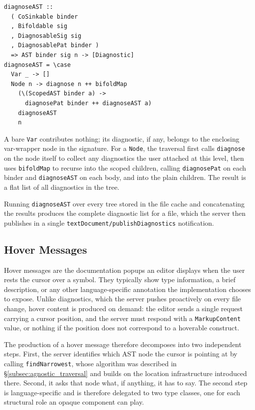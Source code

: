 \begin{verbatim}
diagnoseAST ::
  ( CoSinkable binder
  , Bifoldable sig
  , DiagnosableSig sig
  , DiagnosablePat binder )
  => AST binder sig n -> [Diagnostic]
diagnoseAST = \case
  Var _ -> []
  Node n -> diagnose n ++ bifoldMap
    (\(ScopedAST binder a) ->
      diagnosePat binder ++ diagnoseAST a)
    diagnoseAST
    n
\end{verbatim}

A bare \texttt{Var} contributes nothing; its diagnostic, if any, belongs to the enclosing var-wrapper node in the signature.
For a \texttt{Node}, the traversal first calls \texttt{diagnose} on the node itself to collect any diagnostics the user attached at this level, then uses \texttt{bifoldMap} to recurse into the scoped children, calling \texttt{diagnosePat} on each binder and \texttt{diagnoseAST} on each body, and into the plain children.
The result is a flat list of all diagnostics in the tree.

Running \texttt{diagnoseAST} over every tree stored in the file cache and concatenating the results produces the complete diagnostic list for a file, which the server then publishes in a single \texttt{textDocument/publishDiagnostics} notification.

\subsection{Hover Messages}
\label{section:hover_messages}

Hover messages are the documentation popups an editor displays when the user rests the cursor over a symbol.
They typically show type information, a brief description, or any other language-specific annotation the implementation chooses to expose.
Unlike diagnostics, which the server pushes proactively on every file change, hover content is produced on demand: the editor sends a single request carrying a cursor position, and the server must respond with a \texttt{MarkupContent} value, or nothing if the position does not correspond to a hoverable construct.

The production of a hover message therefore decomposes into two independent steps.
First, the server identifies which AST node the cursor is pointing at by calling \texttt{findNarrowest}, whose algorithm was described in \S\ref{subsec:agnostic_traversal} and builds on the location infrastructure introduced there.
Second, it asks that node what, if anything, it has to say.
The second step is language-specific and is therefore delegated to two type classes, one for each structural role an opaque component can play.

